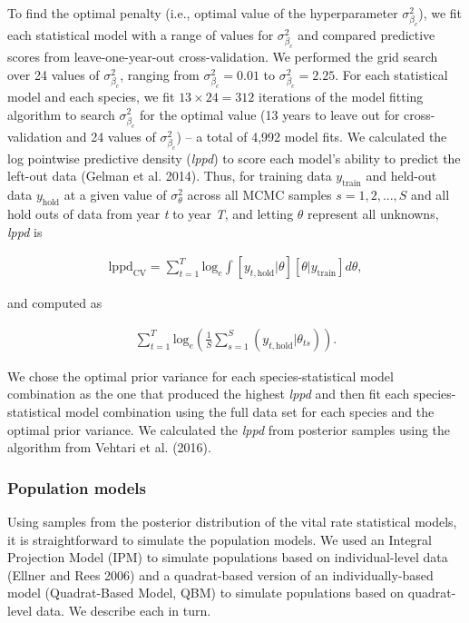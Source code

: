 \documentclass[12pt,]{article}
\begin{document}
To find the optimal penalty (i.e., optimal value of the hyperparameter
\(\sigma_{\beta_c}^2\)), we fit each statistical model with a range of
values for \(\sigma_{\beta_c}^2\) and compared predictive scores from
leave-one-year-out cross-validation. We performed the grid search over
24 values of \(\sigma_{\beta_c}^2\), ranging from
\(\sigma_{\beta_c}^2 = 0.01\) to \(\sigma_{\beta_c}^2 = 2.25\). For each
statistical model and each species, we fit \(13\times24=312\) iterations
of the model fitting algorithm to search \(\sigma_{\beta_c}^2\) for the
optimal value (13 years to leave out for cross-validation and 24 values
of \(\sigma_{\beta_c}^2\)) -- a total of 4,992 model fits. We calculated
the log pointwise predictive density (\emph{lppd}) to score each model's
ability to predict the left-out data (Gelman et al. 2014). Thus, for
training data \(y_{\text{train}}\) and held-out data \(y_{\text{hold}}\)
at a given value of \(\sigma_\theta^2\) across all MCMC samples
\(s=1,2,...,S\) and all hold outs of data from year \emph{t} to year
\emph{T}, and letting \(\theta\) represent all unknowns, \emph{lppd} is

\vspace{-3em}\begin{align}
\text{lppd}_{\text{CV}} = \sum_{t=1}^T \text{log}_e \int [y_{t,\text{hold}}|\theta][\theta|y_{\text{train}}]d\theta,
\end{align}\vspace{-3em}

and computed as

\vspace{-3em}\begin{align}
\sum_{t=1}^T \text{log}_e \left(\frac{1}{S} \sum^S_{s=1}(y_{t,\text{hold}}|\theta_{ts})  \right).
\end{align}\vspace{-3em}

We chose the optimal prior variance for each species-statistical model
combination as the one that produced the highest \emph{lppd} and then
fit each species-statistical model combination using the full data set
for each species and the optimal prior variance. We calculated the
\emph{lppd} from posterior samples using the algorithm from Vehtari et
al. (2016).

\subsubsection{Population models}\label{population-models}

Using samples from the posterior distribution of the vital rate
statistical models, it is straightforward to simulate the population
models. We used an Integral Projection Model (IPM) to simulate
populations based on individual-level data (Ellner and Rees 2006) and a
quadrat-based version of an individually-based model (Quadrat-Based
Model, QBM) to simulate populations based on quadrat-level data. We
describe each in turn.
\end{document}

